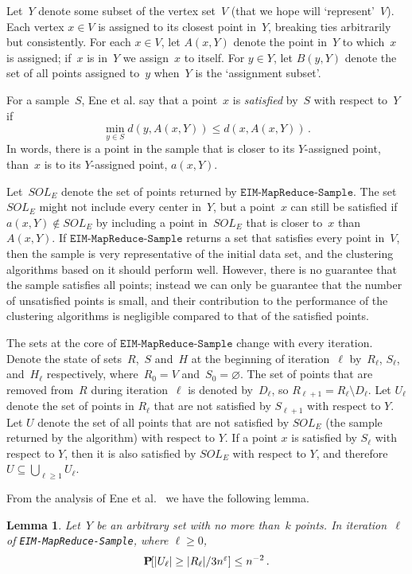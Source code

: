 \documentclass[11pt]{article}
\newtheorem{lemma}[theorem]{Lemma}
\newcommand{\eps}{\ensuremath{\varepsilon}}
\begin{document}
Let~$Y$ denote some subset of the vertex set~$V$ (that we hope will
`represent'~$V$).
Each vertex $x\in V$ is assigned to its closest point in~$Y$,
breaking ties arbitrarily but consistently.
For each $x\in V$, let $A(x,Y)$ denote the point in~$Y$ to which~$x$ is
assigned; if~$x$ is in~$Y$ we assign~$x$ to itself. 
For $y\in Y$, let $B(y,Y)$ denote the set of all points assigned to~$y$
when~$Y$ is the `assignment subset'. 

For a sample~$S$,
Ene et al. say that a point~$x$ is \emph{satisfied} by~$S$ with respect
to~$Y$ if $$\min_{y\in S}d(y,A(x,Y))\leq d(x,A(x,Y))\,.$$
In words, there is a point in the sample that is closer to its $Y$-assigned
point, than~$x$ is to its $Y$-assigned point, $a(x,Y)$. 



Let~$SOL_E$ denote the set of points returned by $\texttt{EIM{-}MapReduce{-}Sample}$. 
The set~$SOL_E$ might not include every center in~$Y$, but a point~$x$ can still be satisfied if $a(x,Y)\notin SOL_E$
by including a point in~$SOL_E$ that is closer to~$x$ than $A(x,Y)$. 
If $\texttt{EIM{-}MapReduce{-}Sample}$ returns a set 
that satisfies every point in~$V$,
then the sample is very representative of the initial data set,
and the clustering algorithms based on it should perform well.
However, there is no guarantee that the sample satisfies all points;
instead we can only be guarantee that the number of unsatisfied points
is small, and their contribution to the performance of the clustering algorithms is negligible compared to that of the satisfied points.

The sets at the core of $\texttt{EIM{-}MapReduce{-}Sample}$
change with every iteration. 
Denote the state of  sets~$R$,~$S$ and~$H$ at the beginning 
of iteration~$\ell$ by~$R_\ell$, $S_\ell$,
and~$H_\ell$ respectively,
where~$R_0=V$ and~$S_0=\varnothing$.
The set of points that are removed from~$R$ during iteration~$\ell$ is
denoted by~$D_\ell$, so $R_{\ell+1}=R_\ell\setminus D_\ell$. 
Let $U_\ell$ denote the set of points in $R_\ell$ that are not satisfied by $S_{\ell+1}$ with respect to $Y$. 
Let $U$ denote the set of all points that are not satisfied by $SOL_E$ (the sample returned by the algorithm) with respect to $Y$. 
If a point $x$ is satisfied by $S_\ell$ with respect to $Y$, then it is also satisfied by $SOL_E$ with respect to $Y$, and therefore $U\subseteq \bigcup_{\ell\geq 1}U_\ell$.


From the analysis of Ene et al.~\cite{ene2011fast} we have the following lemma.
\begin{lemma}
\label{unsatisfied}
Let~$Y$ be an arbitrary set with no more than~$k$ points. 
In iteration~$\ell$ of \sloppy\texttt{EIM{-}MapReduce}\texttt{{-}Sample}, where $\ell\geq0$,
$$\mathbf{P}\hspace{-1mm}\left[|U_{\ell}|\geq |R_{\ell}|/3n^{\eps}\right]\leq
n^{-2}\,.$$
\end{lemma}
\end{document}
